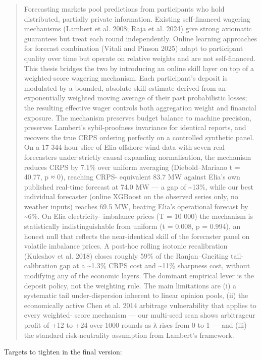 \documentclass[11pt,a4paper,openany]{report}
\begin{document}
\begin{quote}
Forecasting markets pool predictions from participants who hold
distributed, partially private information. Existing self-financed
wagering mechanisms (Lambert et al. 2008; Raja et al. 2024) give strong
axiomatic guarantees but treat each round independently. Online learning
approaches for forecast combination (Vitali and Pinson 2025) adapt to
participant quality over time but operate on relative weights and are
not self-financed. This thesis bridges the two by introducing an online
skill layer on top of a weighted-score wagering mechanism. Each
participant's deposit is modulated by a bounded, absolute skill estimate
derived from an exponentially weighted moving average of their past
probabilistic losses; the resulting effective wager controls both
aggregation weight and financial exposure. The mechanism preserves
budget balance to machine precision, preserves Lambert's sybil-proofness
invariance for identical reports, and recovers the true CRPS ordering
perfectly on a controlled synthetic panel. On a 17 344-hour slice of
Elia offshore-wind data with seven real forecasters under strictly
causal expanding normalisation, the mechanism reduces CRPS by 7.1\% over
uniform averaging (Diebold–Mariano t = 40.77, p ≈ 0), reaching CRPS-
equivalent 83.7 MW against Elia's own published real-time forecast at
74.0 MW — a gap of \textasciitilde{}13\%, while our best individual forecaster (online
XGBoost on the observed series only, no weather inputs) reaches 69.5
MW, beating Elia's operational forecast by \textasciitilde{}6\%. On Elia electricity-
imbalance prices (T = 10 000) the mechanism is
statistically indistinguishable from uniform (t = 0.008, p = 0.994), an
honest null that reflects the near-identical skill of the forecaster
panel on volatile imbalance prices. A post-hoc rolling isotonic
recalibration (Kuleshov et al. 2018) closes roughly 59\% of the
Ranjan–Gneiting tail-calibration gap at a \textasciitilde{}1.3\% CRPS cost and \textasciitilde{}11\%
sharpness cost, without modifying any of the economic layers. The
dominant empirical lever is the deposit policy, not the weighting rule.
The main limitations are (i) a systematic tail under-dispersion
inherent to linear opinion pools, (ii) the economically active Chen
et al. 2014 arbitrage vulnerability that applies to every weighted-
score mechanism — our multi-seed scan shows arbitrageur profit of +12
to +24 over 1000 rounds as λ rises from 0 to 1 — and (iii) the
standard risk-neutrality assumption from Lambert's framework.

\end{quote}
Targets to tighten in the final version:
\end{document}
